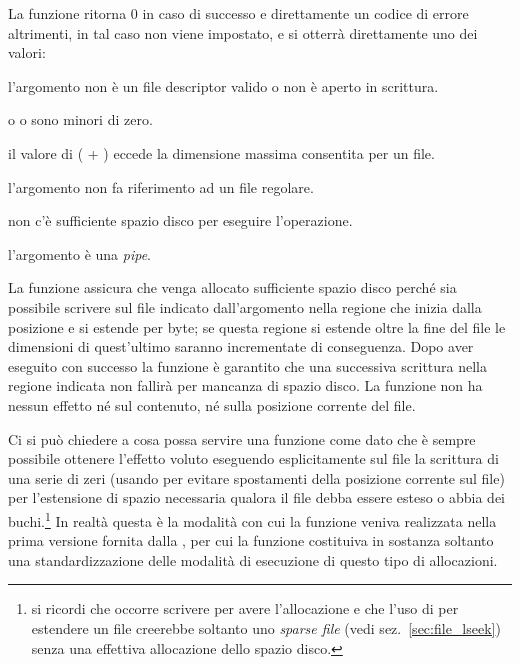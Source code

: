 \begin{funcproto}{
}

{La funzione ritorna $0$ in caso di successo e direttamente un codice di
  errore altrimenti, in tal caso  non viene impostato, e si otterrà
  direttamente uno dei valori:
  \begin{errlist}
    \item[\errcode{EBADF}] l'argomento  non è un file descriptor
      valido o non è aperto in scrittura.
    \item[\errcode{EINVAL}] o  o  sono minori di
      zero.
    \item[\errcode{EFBIG}] il valore di ( + ) eccede
      la dimensione massima consentita per un file.
    \item[\errcode{ENODEV}] l'argomento  non fa riferimento ad un
      file regolare.
    \item[\errcode{ENOSPC}] non c'è sufficiente spazio disco per eseguire
      l'operazione. 
    \item[\errcode{ESPIPE}] l'argomento  è una \textit{pipe}.
  \end{errlist}
}
\end{funcproto}

La funzione assicura che venga allocato sufficiente spazio disco perché sia
possibile scrivere sul file indicato dall'argomento  nella regione
che inizia dalla posizione  e si estende per  byte;
se questa regione si estende oltre la fine del file le dimensioni di
quest'ultimo saranno incrementate di conseguenza. Dopo aver eseguito con
successo la funzione è garantito che una successiva scrittura nella regione
indicata non fallirà per mancanza di spazio disco. La funzione non ha nessun
effetto né sul contenuto, né sulla posizione corrente del file.

Ci si può chiedere a cosa possa servire una funzione come
 dato che è sempre possibile ottenere l'effetto voluto
eseguendo esplicitamente sul file la scrittura di una serie di zeri (usando
 per evitare spostamenti della posizione corrente sul file) per
l'estensione di spazio necessaria qualora il file debba essere esteso o abbia
dei buchi.\footnote{si ricordi che occorre scrivere per avere l'allocazione e
  che l'uso di  per estendere un file creerebbe soltanto uno
  \textit{sparse file} (vedi sez.~\ref{sec:file_lseek}) senza una effettiva
  allocazione dello spazio disco.}  In realtà questa è la modalità con cui la
funzione veniva realizzata nella prima versione fornita dalla , per
cui la funzione costituiva in sostanza soltanto una standardizzazione delle
modalità di esecuzione di questo tipo di allocazioni.

